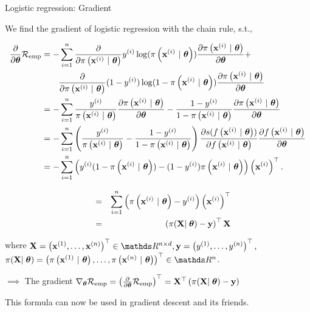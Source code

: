 \documentclass[11pt,compress,t,notes=noshow, xcolor=table]{beamer}
\begin{document}
\begin{vbframe}{Logistic regression: Gradient}

We find the gradient of logistic regression with the chain rule, s.t., 

\vspace*{-0.5cm}

{\small
\begin{align*}
  \frac{\partial}{\partial\thetav}\riske  & =  
 -\sumin \frac{\partial}{\partial\pixit }\yi\log(\pixit)\frac{\partial\pixit}{\partial \thetav} +  \\
 & \qquad \frac{\partial}{\partial\pixit} (1-\yi)\log(1-\pixit)\frac{\partial\pixit}{\partial \thetav}\\
 & =  
 -\sumin \frac{\yi}{\pixit}\frac{\partial\pixit}{\partial \thetav} -  \frac{1-\yi}{1-\pixit}\frac{\partial\pixit}{\partial \thetav}\\
 &=  
  -\sumin \left(\frac{\yi}{\pixit} -  \frac{1-\yi}{1-\pixit}\right)\frac{\partial s(\fxit)}{\partial  \fxit}\frac{\partial  \fxit}{\partial\thetav}\\
  &=  
  -\sum^n_{i=1} \left(\yi(1-\pixit)  -  (1-\yi)\pixit \right)\left(\xi\right)^\top.\\
\end{align*}
}


\framebreak
\begin{align*}
  \quad &=& 
  \sumin \left(\pixit - \yi\right)\left(\xi\right)^\top\\
    \quad &=& 
  \left(\pi(\mathbf{X}\vert\;\thetav) - \mathbf{y}\right)^\top\mathbf{X}\\
\end{align*}

where  $\mathbf{X} = \left(
    \xi[1], \dots, 
    \xi[n]\right)^\top \in \R^{n\times d}, \mathbf{y} = \left(
    \yi[1], \dots,
    \yi[n]
\right)^\top,$ \\ $\pi(\mathbf{X}\vert\;\thetav) = \left(
    \pixit[1], \dots,
    \pixit[n]
\right)^\top \in \R^{n}$.

\vspace*{1cm}

$\implies$ The gradient $\nabla_{\thetav}\riske = \left(\frac{\partial}{\partial\thetav}\riske\right)^\top =  \mathbf{X}^\top\left(\pi(\mathbf{X}\vert\;\thetav) - \mathbf{y}\right)$ 

\vspace*{1cm}

This formula can now be used in gradient descent and its friends.

\end{vbframe}
\end{document}
